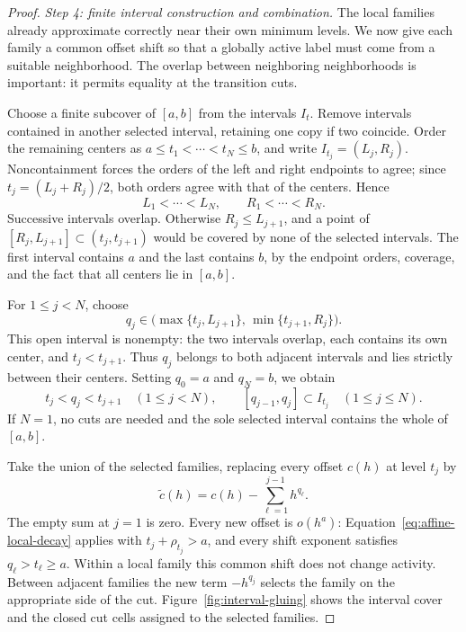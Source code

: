 \begin{proof}
\medskip
\noindent\emph{Step 4: finite interval construction and combination.}
The local families already approximate correctly near their own minimum
levels. We now give each family a common offset shift so that a globally
active label must come from a suitable neighborhood. The overlap between
neighboring neighborhoods is important: it permits equality at the
transition cuts.

Choose a finite subcover of $[a,b]$ from the intervals $I_t$.  Remove
intervals contained in another selected interval, retaining one copy if
two coincide.  Order the remaining centers as
\mbox{$a\leq t_1<\cdots<t_N\leq b$}, and write
$I_{t_j}=(L_j,R_j)$.  Noncontainment forces the orders of the left and
right endpoints to agree; since $t_j=(L_j+R_j)/2$, both orders agree
with that of the centers.  Hence
\[
  L_1<\cdots<L_N,\qquad R_1<\cdots<R_N.
\]
Successive intervals overlap.  Otherwise $R_j\leq L_{j+1}$, and a
point of $[R_j,L_{j+1}]\subset(t_j,t_{j+1})$ would be covered by none
of the selected intervals.  The first interval contains $a$ and the
last contains $b$, by the endpoint orders, coverage, and the fact that
all centers lie in $[a,b]$.

For $1\leq j<N$, choose
\[
  q_j\in
  \bigl(\max\{t_j,L_{j+1}\},\,
        \min\{t_{j+1},R_j\}\bigr).
\]
This open interval is nonempty: the two intervals overlap, each contains
its own center, and $t_j<t_{j+1}$.  Thus $q_j$ belongs to both adjacent
intervals and lies strictly between their centers.  Setting $q_0=a$ and
$q_N=b$, we obtain
\begin{equation}
  t_j<q_j<t_{j+1}\quad(1\leq j<N),\qquad
  [q_{j-1},q_j]\subset I_{t_j}\quad(1\leq j\leq N).
  \label{eq:affine-cuts}
\end{equation}
If $N=1$, no cuts are needed and the sole selected interval contains
the whole of $[a,b]$.

Take the union of the selected families, replacing every offset $c(h)$
at level $t_j$ by
\begin{equation}
  \widetilde c(h)=c(h)-\sum_{\ell=1}^{j-1}h^{q_\ell}.
  \label{eq:affine-shifts}
\end{equation}
The empty sum at $j=1$ is zero.  Every new offset is $o(h^a)$:
Equation~\eqref{eq:affine-local-decay} applies with $t_j+\rho_{t_j}>a$,
and every shift exponent satisfies $q_\ell>t_\ell\geq a$.
Within a local family this common shift does not change activity. Between
adjacent families the new term $-h^{q_j}$ selects the family on the
appropriate side of the cut. Figure~\ref{fig:interval-gluing} shows the
interval cover and the closed cut cells assigned to the selected families.


\end{proof}
